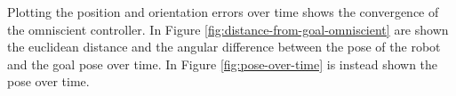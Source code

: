 %
%

Plotting the position and orientation errors over time shows the convergence of 
the omniscient controller. In Figure \ref{fig:distance-from-goal-omniscient} 
are shown the euclidean distance and the angular difference between the pose of 
the robot and the goal pose over time. In Figure \ref{fig:pose-over-time} is 
instead shown the pose over time.

%	
%
%	
